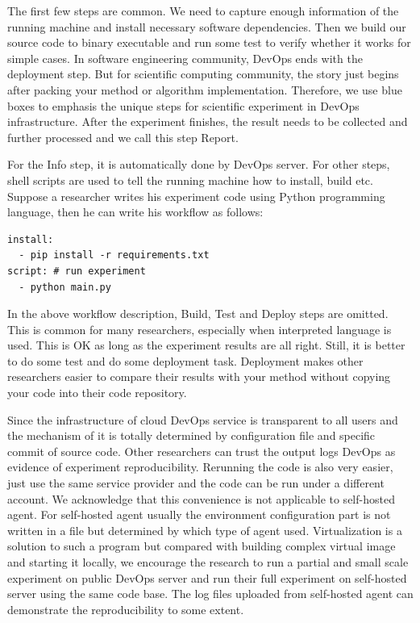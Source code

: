 \documentclass{IEEEcsmag}
\begin{document}
The first few steps are common. We need to capture enough information of the running machine and install necessary software dependencies. Then we build our source code to binary executable and run some test to verify whether it works for simple cases. In software engineering community, DevOps ends with the deployment step. But for scientific computing community, the story just begins after packing your method or algorithm implementation. Therefore, we use blue boxes to emphasis the unique steps for scientific experiment in DevOps infrastructure. After the experiment finishes, the result needs to be collected and further processed and we call this step Report.

For the Info step, it is automatically done by DevOps server. For other steps, shell scripts are used to tell the running machine how to install, build etc. Suppose a researcher writes his experiment code using Python programming language, then he can write his workflow as follows:
\begin{lstlisting}[caption={workflow description}, label={lst:wd}]
install: 
  - pip install -r requirements.txt
script: # run experiment
  - python main.py
\end{lstlisting}

In the above workflow description, Build, Test and Deploy steps are omitted. This is common for many researchers, especially when interpreted language is used. This is OK as long as the experiment results are all right. Still, it is better to do some test and do some deployment task. Deployment makes other researchers easier to compare their results with your method without copying your code into their code repository.

Since the infrastructure of cloud DevOps service is transparent to all users and the mechanism of it is totally determined by configuration file and specific commit of source code. Other researchers can trust the output logs DevOps as evidence of experiment reproducibility. Rerunning the code is also very easier, just use the same service provider and the code can be run under a different account. We acknowledge that this convenience is not applicable to self-hosted agent. For self-hosted agent usually the environment configuration part is not written in a file but determined by which type of agent used. Virtualization is a solution to such a program but compared with building complex virtual image and starting it locally, we encourage the research to run a partial and small scale experiment on public DevOps server and run their full experiment on self-hosted server using the same code base. The log files uploaded from self-hosted agent can demonstrate the reproducibility to some extent.
\end{document}
